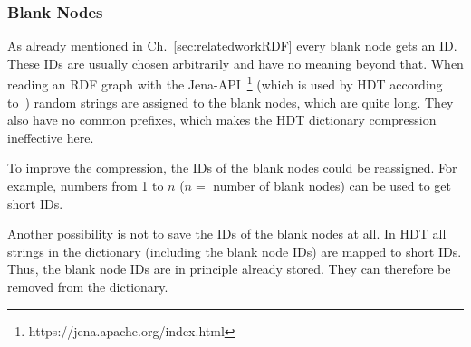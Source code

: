 \subsubsection{Blank Nodes}\label{sec:approachBlankNodes}

As already mentioned in Ch.~\ref{sec:relatedworkRDF} every blank node gets an ID. These IDs are usually chosen arbitrarily and have no meaning beyond that. When reading an RDF graph with the Jena-API~\footnote{\label{foot:5}https://jena.apache.org/index.html} (which is used by HDT according to~\cite{hdt}) random strings are assigned to the blank nodes, which are quite long. They also have no common prefixes, which makes the HDT dictionary compression ineffective here. 

To improve the compression, the IDs of the blank nodes could be reassigned. For example, numbers from 1 to $n$ ($n=$ number of blank nodes) can be used to get short IDs. 

Another possibility is not to save the IDs of the blank nodes at all. In HDT all strings in the dictionary (including the blank node IDs) are mapped to short IDs. Thus, the blank node IDs are in principle already stored. They can therefore be removed from the dictionary. 















